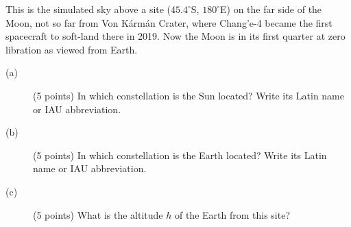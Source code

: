 This is the simulated sky above a site ($45.4^\circ$S, $180^\circ$E) on the
far side of the Moon, not so far from Von K\'arm\'an Crater, where Chang'e-4
became the first spacecraft to soft-land there in 2019. Now the Moon is in its
first quarter at zero libration as viewed from Earth.

\begin{description}
\item[(a)] (5 points) In which constellation is the Sun located? Write its
  Latin name or IAU abbreviation.
\item[(b)] (5 points) In which constellation is the Earth located? Write its
  Latin name or IAU abbreviation.
\item[(c)] (5 points) What is the altitude $h$ of the Earth from this site?
\end{description}
